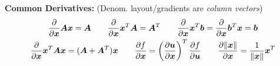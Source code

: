 \documentclass[twocolumn, 8pt]{extarticle}
\begin{document}
\textbf{Common Derivatives:} (Denom. layout/gradients are \emph{column vectors})
\begin{gather*}
  \frac{\partial}{\partial\bm x} \bm A\bm x = \bm A \qquad \frac{\partial}{\partial\bm x} \bm x^T\bm A = \bm A^T \qquad \frac{\partial}{\partial\bm x}\bm x^T\bm b = \frac{\partial}{\partial\bm x}\bm b^T\bm x = \bm b \\
  \frac{\partial}{\partial\bm x}\bm x^T\bm A\bm x = (\bm A + \bm A^T)\bm x \qquad \frac{\partial f}{\partial\bm x} = \left(\frac{\partial\bm u}{\partial\bm x}\right)^T\frac{\partial f}{\partial\bm u} \qquad \frac{\partial\lVert\bm x\rVert}{\partial\bm x} = \frac{1}{\lVert\bm x\rVert}\bm x^T \\
\end{gather*}
\end{document}
